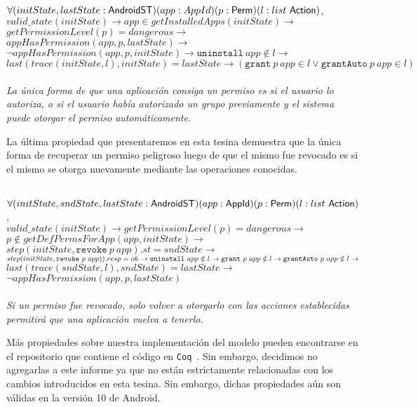 \begin{prop}
    \label{impproperty2}
    \mbox{} \\
    $	\forall (initState,lastState:\mathsf{AndroidST}) (app:AppId) (p:\mathsf{Perm}) (l: list\ \mathsf{Action})$, \\
    $	valid\_state(initState) \rightarrow app \in getInstalledApps(initState) \rightarrow$ \\
    $	getPermissionLevel(p)= dangerous \rightarrow $\\
    $	appHasPermission(app,p,lastState) \rightarrow$\\
    $	\neg appHasPermission(app,p,initState)\rightarrow \texttt{uninstall}~app \notin l \rightarrow
    $ \\
    $	last(trace(initState,l),initState) = lastState \rightarrow (\texttt{grant}~p~app \in l \lor
        \texttt{grantAuto}~p~app \in l)$ \\ \\
    \textit{La única forma de que una aplicación consiga un permiso es si el usuario lo autoriza, o
        si el usuario había autorizado un grupo previamente y el sistema puede otorgar el permiso
        automáticamente.}
\end{prop}

La última propiedad que presentaremos en esta tesina demuestra que la única forma de recuperar un
permiso peligroso luego de que el mismo fue revocado es si el mismo se otorga nuevamente mediante
las operaciones conocidas.

\begin{prop}
    \mbox{} \\
    $	\forall (initState,sndState,lastState:\mathsf{AndroidST}) (app:\mathsf{AppId}) (p:\mathsf{Perm}) (l:
        list~\mathsf{Action})$, \\
    $	valid\_state(initState) \rightarrow getPermissionLevel(p) = dangerous \rightarrow$ \\
    $   p \notin getDefPermsForApp(app,initState) \rightarrow$ \\
    $	step(initState,\texttt{revoke}~p~app).st = sndState \rightarrow$ \\
    $	step(initState, \texttt{revoke}~p~app)).resp=ok \rightarrow \\
        \texttt{uninstall}~app \notin l \rightarrow \texttt{grant}~p~app \notin l \rightarrow
        \texttt{grantAuto}~p~app \notin l \rightarrow $\\
    $	last(trace(sndState,l),sndState) = lastState \rightarrow$\\
    $	\neg appHasPermission(app,p,lastState)$ \\ \\
    \textit{Si un permiso fue revocado, solo volver a otorgarlo con las acciones establecidas
        permitirá que una aplicación vuelva a tenerlo.}
\end{prop}

Más propiedades sobre nuestra implementación del modelo pueden encontrarse en el repositorio que
contiene el código en \texttt{Coq}~\cite{github-code}. Sin embargo, decidimos no agregarlas a este
informe ya que no están estrictamente relacionadas con los cambios introducidos en esta tesina. Sin
embargo, dichas propiedades aún son válidas en la versión 10 de Android.